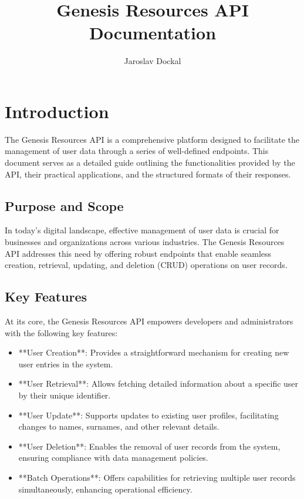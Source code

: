 \documentclass[12pt]{article}
\title{Genesis Resources API Documentation}
\author{Jaroslav Dockal}
\begin{document}
	\maketitle

	\newpage

	\tableofcontents

	\newpage

	\section{Introduction}

	The Genesis Resources API is a comprehensive platform designed to facilitate the management of user data through a series of well-defined endpoints. This document serves as a detailed guide outlining the functionalities provided by the API, their practical applications, and the structured formats of their responses.

	\subsection{Purpose and Scope}

	In today's digital landscape, effective management of user data is crucial for businesses and organizations across various industries. The Genesis Resources API addresses this need by offering robust endpoints that enable seamless creation, retrieval, updating, and deletion (CRUD) operations on user records.

	\subsection{Key Features}

	At its core, the Genesis Resources API empowers developers and administrators with the following key features:

	\begin{itemize}
		\item **User Creation**: Provides a straightforward mechanism for creating new user entries in the system.
		\item **User Retrieval**: Allows fetching detailed information about a specific user by their unique identifier.
		\item **User Update**: Supports updates to existing user profiles, facilitating changes to names, surnames, and other relevant details.
		\item **User Deletion**: Enables the removal of user records from the system, ensuring compliance with data management policies.
		\item **Batch Operations**: Offers capabilities for retrieving multiple user records simultaneously, enhancing operational efficiency.
	\end{itemize}
\end{document}
